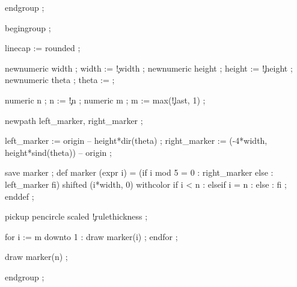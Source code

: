   endgroup ;
\stopuseMPgraphic




  begingroup ;

  linecap := rounded ;

  newnumeric width  ; width  := \visualcounterparameter\c!width ;
  newnumeric height ; height := \visualcounterparameter\c!height ;
  newnumeric theta  ; theta  :=  ;

  numeric n ; n := \visualcounterparameter\c!n ;
  numeric m ; m := max(\visualcounterparameter\c!last, 1) ;


  newpath left_marker, right_marker ;

  left_marker   := origin -- height*dir(theta) ;
  right_marker  := (-4*width, height*sind(theta)) -- origin ;

  save marker ;
  def marker (expr i) =
	(if i mod 5 = 0 : right_marker else : left_marker fi) 
		shifted (i*width, 0) 
		withcolor
			if i < n     :  
			elseif i = n : 
			else         : 
			fi ;
  enddef ;

  pickup pencircle scaled \visualcounterparameter\c!rulethickness ;

  for i := m downto 1 :
	  draw marker(i) ;
  endfor ;

  draw marker(n) ;

  endgroup ;
\stopuseMPgraphic



